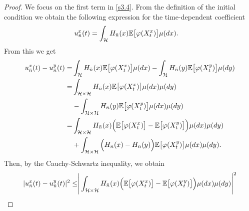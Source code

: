 \documentclass[review, onefignum, onetabnum]{siamart171218}
\begin{document}
\begin{proof}
    We focus on the first term in \eqref{s3.4}. From the definition of the
initial condition we obtain the following expression for
the time-dependent coefficient
\begin{align*}
  u_{\bar n}^x(t) &=
    \int_{\mathcal{H}} H_{\bar n}(x) \mathbb{E}\big[\varphi(X_t^x)\big] \mu(dx).
\end{align*}
%
From this we get
\begin{align*}
    u_{\bar n}^x(t)-u_{\bar n}^y(t)
        =&
        \int_{\mathcal{H}} H_{\bar n}(x)
            \mathbb{E}\big[
                \varphi(X_t^x)
            \big]
            \mu(dx) -
            \int_{\mathcal{H}} H_{\bar n}(y)
            \mathbb{E}\big[
                \varphi(X_t^y)
            \big] \mu(dy)
        \\
        =&
        \int_{\mathcal{H} \times \mathcal{H}} H_{\bar n}(x)
            \mathbb{E}\big[
                \varphi(X_t^x)
            \big] \mu(dx)\mu(dy)
        \\
        &-
             \int_{\mathcal{H}\times \mathcal{H}} H_{\bar n}(y)
                \mathbb{E}\big[
                    \varphi(X_t^y)
                \big]
            \mu(dx)\mu(dy)
        \\
        =&
        \int_{\mathcal{H}\times \mathcal{H}} H_{\bar n}(x)
            \Big(
                \mathbb{E}\big[
                    \varphi(X_t^x)
                \big]
                -
                \mathbb{E}\big[
                    \varphi(X_t^y)
                \big]
            \Big)
            \mu(dx)\mu(dy)
        \\
        &+
        \int_{\mathcal{H}\times \mathcal{H}}
            \Big(
                H_{\bar n}(x) - H_{\bar n}(y)
            \Big)
            \mathbb{E}\big[
                \varphi(X_t^y)
            \big] \mu(dx) \mu(dy) .
\end{align*}
%
%
%
Then, by the Cauchy-Schwartz inequality, we obtain
%
%
%
\begin{equation}
    \label{s3.4.1}
    \begin{aligned}
        |u_{\bar n} ^ x(t) - u_{\bar n} ^ y(t)| ^ 2
            \le&
            \Bigg |
                \int_{\mathcal{H} \times
                \mathcal{H}} H_{\bar n}(x)
                \Big(
                    \E
                     \big[
                        \varphi(X_t^x)
                     \big]
                     -
                    \E\big[
                        \varphi(X_t^y)
                    \big]
                \Big) \mu(dx)\mu(dy)
                \Bigg|^2
            \\

\end{aligned}
\end{equation}
\end{proof}
\end{document}
